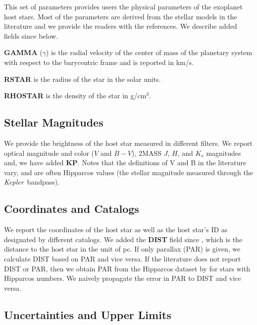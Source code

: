 \documentclass[11pt,preprint]{aastex}
\def\kepler{\textit{Kepler}}
\begin{document}
\begin{CJK*}{UTF8}{gbsn}
This set of parameters provides users the physical parameters of
the exoplanet host stars.  Most of the parameters are derived from the
stellar models in the literature and we provide the readers with the
references. We describe added fields since \cite{Wright2011} below.

{\bf GAMMA} ($\gamma$) is the radial velocity of the center of mass of
the planetary system with respect to the barycentric frame and is reported in km/s.

{\bf RSTAR} is the radius of the star in the solar units.

{\bf RHOSTAR} is the density of the star in g/cm$^3$.

\subsection{Stellar Magnitudes}\label{sec:stellarmag}

We provide the brightness of the host star measured in different
filters. We report optical magnitude and color ($V$ and $B-V$),
2MASS $J$, $H$, and $K_s$ magnitudes and, we have added {\bf KP}. Notes that the definitions of V and B in the literature vary, and are often Hipparcos values
(the stellar magnitude measured through the \kepler\ bandpass).


\subsection{Coordinates and Catalogs}\label{sec:coord}

We report the coordinates of the host star as well as the host star's
ID as designated by different catalogs.  We added the {\bf DIST} field since
\cite{Wright2011}, which is the distance to the host star in the unit
of pc. If only parallax (PAR) is given, we calculate DIST based on PAR
and vice versa. If the literature does not report DIST or PAR, then we
obtain PAR from the Hipparcos dataset by \cite{van Leeuwen2009} for stars with Hipparcos numbers. We
naively propagate the error in PAR to DIST and vice versa.

\subsection{Uncertainties and Upper Limits}\label{sec:unc}


\end{CJK*}
\end{document}
